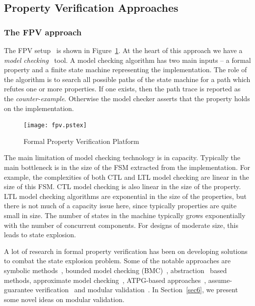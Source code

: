 \documentclass[a4paper, 11pt]{article}
\begin{document}
\subsection{Property Verification Approaches} \label{sec2.2}
\subsubsection{The FPV approach} \label{sec2.2.1}
The FPV setup~\cite{pdgbook} is shown in Figure~\ref{fig1.4}. At the heart of 
this approach we have a {\em model checking}~\cite{clarke:00} tool. 
A model checking
algorithm has two main
inputs -- a formal property and a finite state machine representing the
implementation. The role of the algorithm is to search all possible paths
of the state machine for a path which refutes one or more properties. If one
exists, then the path trace is reported as the {\em counter-example}. Otherwise
the model checker asserts that the property holds on the implementation.

\begin{figure}[htb]
\centering
{}
\texttt{[image: fpv.pstex]}
\center
\caption{Formal Property Verification Platform} \label{fig1.4}
\end{figure}

The main limitation of model checking technology is in capacity.
Typically the main bottleneck is in the size of the FSM
extracted from the implementation. For example, the complexities of both CTL
and LTL model checking are linear in the size of this FSM.
CTL model checking is also linear in the
size of the property. LTL model checking algorithms are exponential in the size
of the properties, but there is not much of a capacity issue here, since 
typically properties are quite small in size.
The number of states in the machine typically grows exponentially with the
number of concurrent components. For designs of moderate size, this leads to
state explosion.

A lot of research in formal property verification has been on
developing solutions to combat the state explosion problem. Some of the
notable approaches are symbolic methods~\cite{mc}, bounded model checking 
(BMC)~\cite{bmc}, abstraction~\cite{dam} based methods, approximate model 
checking~\cite{approx}, ATPG-based approaches~\cite{abraham},
assume-guarantee verification~\cite{henzinger} and modular 
validation~\cite{grumberg:94}. In Section~\ref{sec6}, we present some novel 
ideas on modular validation.
\end{document}
